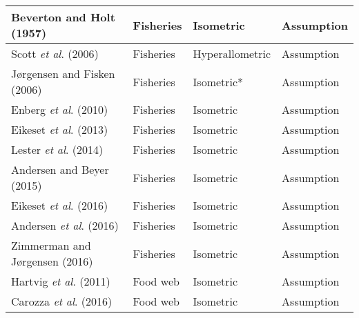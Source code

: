 \documentclass[a4paper]{article} %
\begin{document}
\begin{table}[H]
\begin{tabular}{|l|l|l|l|}
    Beverton and Holt (1957)            & Fisheries                 & Isometric        & Assumption                     \\ \hline
    Scott \textit{et al}. (2006)        & Fisheries                 & Hyperallometric  & Assumption                     \\ \hline
    Jørgensen and Fisken (2006)         & Fisheries                 & Isometric*       & Assumption                     \\ \hline
    Enberg \textit{et al}. (2010)       & Fisheries                 & Isometric        & Assumption                     \\ \hline
    Eikeset \textit{et al}. (2013)      & Fisheries                 & Isometric        & Assumption                     \\ \hline
    Lester \textit{et al}. (2014)       & Fisheries                 & Isometric        & Assumption                     \\ \hline
    Andersen and Beyer (2015)           & Fisheries                 & Isometric        & Assumption                     \\ \hline
    Eikeset \textit{et al}. (2016)      & Fisheries                 & Isometric        & Assumption                     \\ \hline
    Andersen \textit{et al}. (2016)     & Fisheries                 & Isometric        & Assumption                     \\ \hline
    Zimmerman and Jørgensen (2016)      & Fisheries                 & Isometric        & Assumption                     \\ \hline
    Hartvig \textit{et al}. (2011)      & Food web                  & Isometric        & Assumption                     \\ \hline
    Carozza \textit{et al}. (2016)      & Food web                  & Isometric        & Assumption                     \\ \hline
    \end{tabular}
    \label{caloric_equivalents}
\end{table}

\newpage{}

\let\mkbibnamefamily\textsc\printbibliography[title=SI Bibliography]\thispagestyle{empty} %
\end{document}
